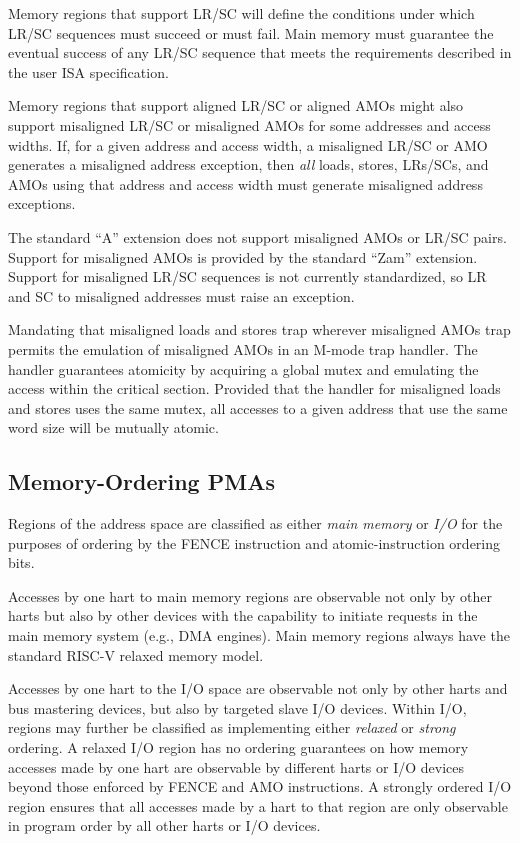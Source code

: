 Memory regions that support LR/SC will define the conditions under which LR/SC
sequences must succeed or must fail.  Main memory must guarantee the eventual
success of any LR/SC sequence that meets the requirements described in the
user ISA specification.

Memory regions that support aligned LR/SC or aligned AMOs might also support
misaligned LR/SC or misaligned AMOs for some addresses and access widths.  If,
for a given address and access width, a misaligned LR/SC or AMO generates
a misaligned address exception, then {\em all} loads, stores, LRs/SCs, and
AMOs using that address and access width must generate misaligned address
exceptions.
\begin{commentary}
The standard ``A'' extension does not support misaligned AMOs or LR/SC pairs.
Support for misaligned AMOs is provided by the standard ``Zam'' extension.
Support for misaligned LR/SC sequences is not currently standardized,
so LR and SC to misaligned addresses must raise an exception.

Mandating that misaligned loads and stores trap wherever misaligned AMOs trap
permits the emulation of misaligned AMOs in an M-mode trap handler.  The
handler guarantees atomicity by acquiring a global mutex and emulating the
access within the critical section.  Provided that the handler for misaligned
loads and stores uses the same mutex, all accesses to a given address that
use the same word size will be mutually atomic.
\end{commentary}

\subsection{Memory-Ordering PMAs}

Regions of the address space are classified as either {\em main
  memory} or {\em I/O} for the purposes of ordering by the FENCE
instruction and atomic-instruction ordering bits.

Accesses by one hart to main memory regions are observable not only by
other harts but also by other devices with the capability to initiate
requests in the main memory system (e.g., DMA engines).  Main memory
regions always have the standard RISC-V relaxed memory model.

Accesses by one hart to the I/O space are observable not only by other
harts and bus mastering devices, but also by targeted slave I/O
devices.  Within I/O, regions may further be classified as
implementing either {\em relaxed} or {\em strong} ordering.  A relaxed
I/O region has no ordering guarantees on how memory accesses made by
one hart are observable by different harts or I/O devices beyond those
enforced by FENCE and AMO instructions.  A strongly ordered I/O region
ensures that all accesses made by a hart to that region are only
observable in program order by all other harts or I/O devices.

